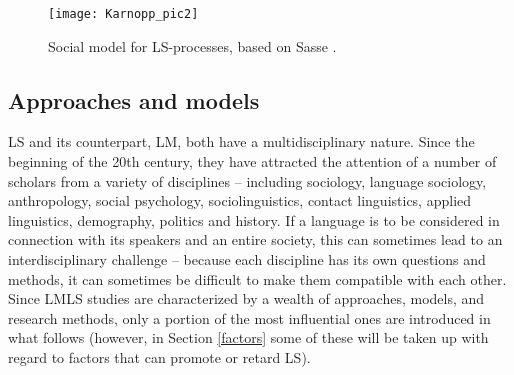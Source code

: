 \documentclass[output=paper,
modfonts
]{langscibook}
\begin{document}
\begin{figure}
\texttt{[image: Karnopp\_pic2]}
\caption{Social model for LS-processes, based on Sasse \parencite*[63]{Sasse1992}.}
  \label{figure2}
\end{figure}

\subsection{Approaches and models}
\label{approachesmodels}

LS and its counterpart, LM, both have a multidisciplinary nature. Since the beginning of the 20th century, they have attracted the attention of a number of scholars from a variety of disciplines -- including sociology, language sociology, anthropology, social psychology, sociolinguistics, contact linguistics, applied linguistics, demography, politics and history. If a language is to be considered in connection with its speakers and an entire society, this can sometimes lead to an interdisciplinary challenge -- because each discipline has its own questions and methods, it can sometimes be difficult to make them compatible with each other. Since LMLS studies are characterized by a wealth of approaches, models, and research methods, only a portion of the most influential ones are introduced in what follows (however, in Section \ref{factors} some of these will be taken up with regard to factors that can promote or retard LS).
\end{document}

